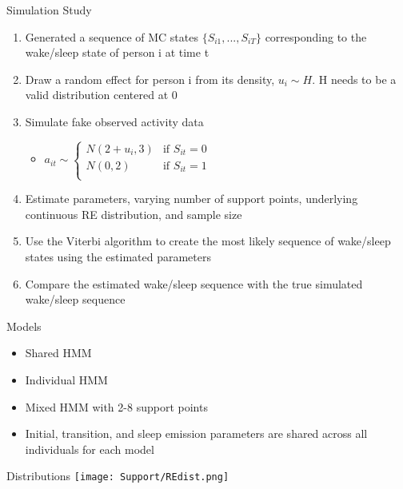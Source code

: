 \documentclass{beamer}
\begin{document}

\begin{frame}{Simulation Study}
\begin{enumerate}
    \item Generated a sequence of MC states $\{S_{i1}, ..., S_{iT}\}$ corresponding to the wake/sleep state of person i at time t
    \item Draw a random effect for person i from its density, $u_i \sim H$. H needs to be a valid distribution centered at 0
    \item Simulate fake observed activity data
    \begin{itemize}
        \item $a_{it} \sim \begin{cases}
                    N(2+u_i,3)  & \text{if } S_{it}=0 \\ 
                    N(0,2)  & \text{if } S_{it}=1 \\ 
    \end{cases}$
    \end{itemize}
    \item Estimate parameters, varying number of support points, underlying continuous RE distribution, and sample size
    \item Use the Viterbi algorithm to create the most likely sequence of wake/sleep states using the estimated parameters
    \item Compare the estimated wake/sleep sequence with the true simulated wake/sleep sequence
\end{enumerate} 

    
\end{frame}


\begin{frame}{Models}
    \begin{itemize}
        \item Shared HMM
        \item Individual HMM
        \item Mixed HMM with 2-8 support points
        \item Initial, transition, and sleep emission parameters are shared across all individuals for each model
    \end{itemize}
\end{frame}
\begin{frame}{Distributions}
\centering
\texttt{[image: Support/REdist.png]}
\end{frame}
\end{document}
